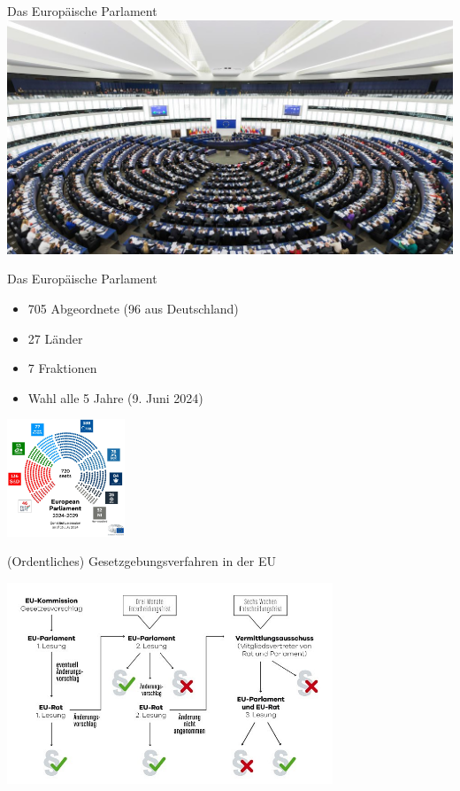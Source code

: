 \documentclass{beamer}
\begin{document}
\begin{frame}{Das Europäische Parlament}
\vspace{-1cm}
\includegraphics[width=\textwidth]{Bilder/ep.png}
\end{frame}

\begin{frame}{Das Europäische Parlament}
    \vspace{-0.5cm}
    \begin{itemize}
        \item 705 Abgeordnete (96 aus Deutschland)
        \item 27 Länder
        \item 7 Fraktionen
        \item Wahl alle 5 Jahre (9. Juni 2024)
    \end{itemize}
    \begin{center}
        \includegraphics[height=3.5cm]{Bilder/EP_seats.jpg}
    \end{center}
\end{frame}

\begin{frame}{(Ordentliches) Gesetzgebungsverfahren in der EU}
\vspace{-0.5cm}
\begin{center}
    \includegraphics[height=6cm]{Bilder/gesetzgebungsprozess.jpg} 
\end{center}
\end{frame}
\end{document}
